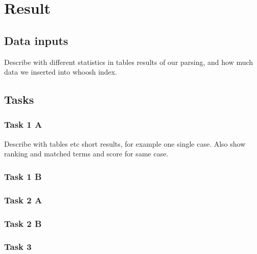 \chapter{Result}


\section{Data inputs}
Describe with different statistics in tables results of our parsing,
and how much data we inserted into whoosh index.


\section{Tasks}

\subsection{Task 1 A}
Describe with tables etc short results, for example one single case.
Also show ranking and matched terms and score for same case.

\subsection{Task 1 B}

\subsection{Task 2 A}

\subsection{Task 2 B}

\subsection{Task 3}


